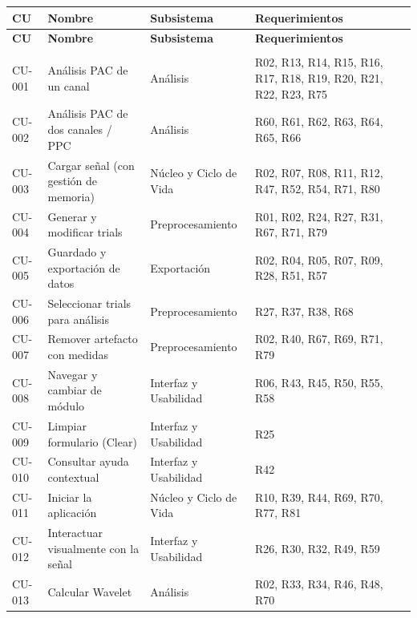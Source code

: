 \documentclass[11pt,a4paper]{article}
\DeclareRobustCommand{\_}{\textunderscore\allowbreak}
\begin{document}
\begin{center}
\small
\begin{longtable}{|>{\raggedright\arraybackslash}p{}|>{\raggedright\arraybackslash}p{}|>{\raggedright\arraybackslash}p{}|>{\raggedright\arraybackslash}p{}|}
\hline
\textbf{CU} & \textbf{Nombre} & \textbf{Subsistema} & \textbf{Requerimientos} \\
\hline
\endfirsthead
\hline
\textbf{CU} & \textbf{Nombre} & \textbf{Subsistema} & \textbf{Requerimientos} \\
\hline
\endhead
\hline
\multicolumn{4}{r}{\textit{Continúa en la siguiente página}} \\
\endfoot
\hline
\endlastfoot

CU-001 & An\'alisis PAC de un canal & Análisis & R02, R13, R14, R15, R16, R17, R18, R19, R20, R21, R22, R23, R75 \\
\hline
CU-002 & An\'alisis PAC de dos canales / PPC & Análisis & R60, R61, R62, R63, R64, R65, R66 \\
\hline
CU-003 & Cargar se\~nal (con gesti\'on de memoria) & Núcleo y Ciclo de Vida & R02, R07, R08, R11, R12, R47, R52, R54, R71, R80 \\
\hline
CU-004 & Generar y modificar trials & Preprocesamiento & R01, R02, R24, R27, R31, R67, R71, R79 \\
\hline
CU-005 & Guardado y exportaci\'on de datos & Exportación & R02, R04, R05, R07, R09, R28, R51, R57 \\
\hline
CU-006 & Seleccionar trials para an\'alisis & Preprocesamiento & R27, R37, R38, R68 \\
\hline
CU-007 & Remover artefacto con medidas & Preprocesamiento & R02, R40, R67, R69, R71, R79 \\
\hline
CU-008 & Navegar y cambiar de m\'odulo & Interfaz y Usabilidad & R06, R43, R45, R50, R55, R58 \\
\hline
CU-009 & Limpiar formulario (Clear) & Interfaz y Usabilidad & R25 \\
\hline
CU-010 & Consultar ayuda contextual & Interfaz y Usabilidad & R42 \\
\hline
CU-011 & Iniciar la aplicaci\'on & Núcleo y Ciclo de Vida & R10, R39, R44, R69, R70, R77, R81 \\
\hline
CU-012 & Interactuar visualmente con la se\~nal & Interfaz y Usabilidad & R26, R30, R32, R49, R59 \\
\hline
CU-013 & Calcular Wavelet & Análisis & R02, R33, R34, R46, R48, R70 \\

\end{longtable}
\end{center}
\end{document}
